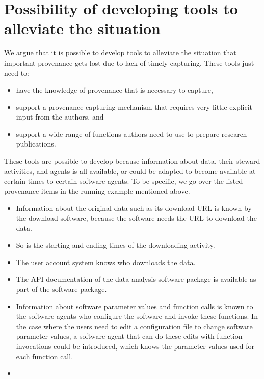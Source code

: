 \section{Possibility of developing tools to alleviate the situation}
We argue that it is possible to develop tools to alleviate the situation that important provenance gets lost due to lack of timely capturing. These tools just need to:
\begin{itemize}
\item have the knowledge of provenance that is necessary to capture,
\item support a provenance capturing mechanism that requires very little explicit input from the authors, and
\item support a wide range of functions authors need to use to prepare research publications.
\end{itemize}
These tools are possible to develop because information about data, their steward activities, and agents is all available, or could be adapted to become available at certain times to certain software agents. To be specific, we go over the listed provenance items in the running example mentioned above. 
\begin{itemize}
\item Information about the original data such as its download URL is known by the download software, because the software needs the URL to download the data. 
\item So is the starting and ending times of the downloading activity. 
\item The user account system knows who downloads the data. 
\item The API documentation of the data analysis software package is available as part of the software package. 
\item Information about software parameter values and function calls is known to the software agents who configure the software and invoke these functions. In the case where the users need to edit a configuration file to change software parameter values, a software agent that can do these edits with function invocations could be introduced, which knows the parameter values used for each function call.
\item 
\end{itemize}



